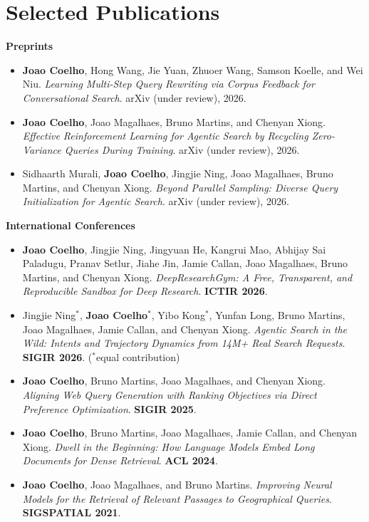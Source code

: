 \documentclass[11pt]{article}       %
\newcommand{\me}{\textbf{Joao Coelho}}
\begin{document}
\section*{Selected Publications}

\textbf{Preprints}
\begin{itemize}
  \item \me, Hong Wang, Jie Yuan, Zhuoer Wang, Samson Koelle, and Wei Niu. \textit{Learning Multi-Step Query Rewriting via Corpus Feedback for Conversational Search}. arXiv (under review), 2026.
  \item \me, Joao Magalhaes, Bruno Martins, and Chenyan Xiong. \textit{Effective Reinforcement Learning for Agentic Search by Recycling Zero-Variance Queries During Training}. arXiv (under review), 2026.
  \item Sidhaarth Murali, \me, Jingjie Ning, Joao Magalhaes, Bruno Martins, and Chenyan Xiong. \textit{Beyond Parallel Sampling: Diverse Query Initialization for Agentic Search}. arXiv (under review), 2026.
\end{itemize}

\textbf{International Conferences}
\begin{itemize}
  \item \me, Jingjie Ning, Jingyuan He, Kangrui Mao, Abhijay Sai Paladugu, Pranav Setlur, Jiahe Jin, Jamie Callan, Joao Magalhaes, Bruno Martins, and Chenyan Xiong. \textit{DeepResearchGym: A Free, Transparent, and Reproducible Sandbox for Deep Research}. \textbf{ICTIR 2026}.
  \item Jingjie Ning$^*$, \me$^*$, Yibo Kong$^*$, Yunfan Long, Bruno Martins, Joao Magalhaes, Jamie Callan, and Chenyan Xiong. \textit{Agentic Search in the Wild: Intents and Trajectory Dynamics from 14M+ Real Search Requests}. \textbf{SIGIR 2026}. ($^*$equal contribution)
  \item \me, Bruno Martins, Joao Magalhaes, and Chenyan Xiong. \textit{Aligning Web Query Generation with Ranking Objectives via Direct Preference Optimization}. \textbf{SIGIR 2025}.
  \item \me, Bruno Martins, Joao Magalhaes, Jamie Callan, and Chenyan Xiong. \textit{Dwell in the Beginning: How Language Models Embed Long Documents for Dense Retrieval}. \textbf{ACL 2024}.
  \item \me, Joao Magalhaes, and Bruno Martins. \textit{Improving Neural Models for the Retrieval of Relevant Passages to Geographical Queries}. \textbf{SIGSPATIAL 2021}.
\end{itemize}
\end{document}
